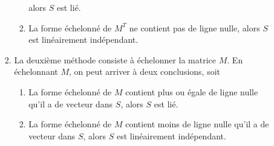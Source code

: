 \begin{itemize}
\begin{itemize}
\begin{enumerate}[1), itemsep = 0.5em]
\begin{enumerate}[1.]
                                        alors $S$ est lié.
                                  \item La forme échelonné de $M^T$ ne contient pas de ligne nulle,
                                        alors $S$ est linéairement indépendant.
                              \end{enumerate}
                        \item La deuxième méthode consiste à échelonner la matrice $M$. En échelonnant $M$, on peut arriver à deux conclusions, soit \begin{enumerate}[1.]
                                  \item La forme échelonné de $M$ contient plus ou égale de ligne nulle qu'il a de vecteur dans $S$,
                                        alors $S$ est lié.
                                  \item La forme échelonné de $M$ contient moins de ligne nulle qu'il a de vecteur dans $S$,
                                        alors $S$ est linéairement indépendant.
                              \end{enumerate}
                    \end{enumerate}
          \end{itemize}
\end{itemize}

